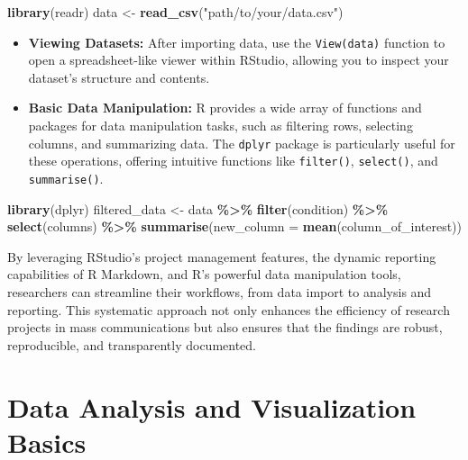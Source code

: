 \documentclass[
]{book}
\newenvironment{Shaded}{\begin{snugshade}}{\end{snugshade}}
\newcommand{\AttributeTok}[1]{\textcolor[rgb]{0.13,0.29,0.53}{#1}}
\newcommand{\FunctionTok}[1]{\textcolor[rgb]{0.13,0.29,0.53}{\textbf{#1}}}
\newcommand{\NormalTok}[1]{#1}
\newcommand{\OtherTok}[1]{\textcolor[rgb]{0.56,0.35,0.01}{#1}}
\newcommand{\SpecialCharTok}[1]{\textcolor[rgb]{0.81,0.36,0.00}{\textbf{#1}}}
\newcommand{\StringTok}[1]{\textcolor[rgb]{0.31,0.60,0.02}{#1}}
\begin{document}
\begin{Shaded}
\begin{Highlighting}[]
\FunctionTok{library}\NormalTok{(readr)}
\NormalTok{data }\OtherTok{\textless{}{-}} \FunctionTok{read\_csv}\NormalTok{(}\StringTok{"path/to/your/data.csv"}\NormalTok{)}
\end{Highlighting}
\end{Shaded}

\begin{itemize}
\item
  \textbf{Viewing Datasets:} After importing data, use the \texttt{View(data)} function to open a spreadsheet-like viewer within RStudio, allowing you to inspect your dataset's structure and contents.
\item
  \textbf{Basic Data Manipulation:} R provides a wide array of functions and packages for data manipulation tasks, such as filtering rows, selecting columns, and summarizing data. The \texttt{dplyr} package is particularly useful for these operations, offering intuitive functions like \texttt{filter()}, \texttt{select()}, and \texttt{summarise()}.
\end{itemize}

\begin{Shaded}
\begin{Highlighting}[]
\FunctionTok{library}\NormalTok{(dplyr)}
\NormalTok{filtered\_data }\OtherTok{\textless{}{-}}\NormalTok{ data }\SpecialCharTok{\%\textgreater{}\%}
  \FunctionTok{filter}\NormalTok{(condition) }\SpecialCharTok{\%\textgreater{}\%}
  \FunctionTok{select}\NormalTok{(columns) }\SpecialCharTok{\%\textgreater{}\%}
  \FunctionTok{summarise}\NormalTok{(}\AttributeTok{new\_column =} \FunctionTok{mean}\NormalTok{(column\_of\_interest))}
\end{Highlighting}
\end{Shaded}

By leveraging RStudio's project management features, the dynamic reporting capabilities of R Markdown, and R's powerful data manipulation tools, researchers can streamline their workflows, from data import to analysis and reporting. This systematic approach not only enhances the efficiency of research projects in mass communications but also ensures that the findings are robust, reproducible, and transparently documented.

\hypertarget{data-analysis-and-visualization-basics}{%
\section{Data Analysis and Visualization Basics}\label{data-analysis-and-visualization-basics}}
\end{document}

